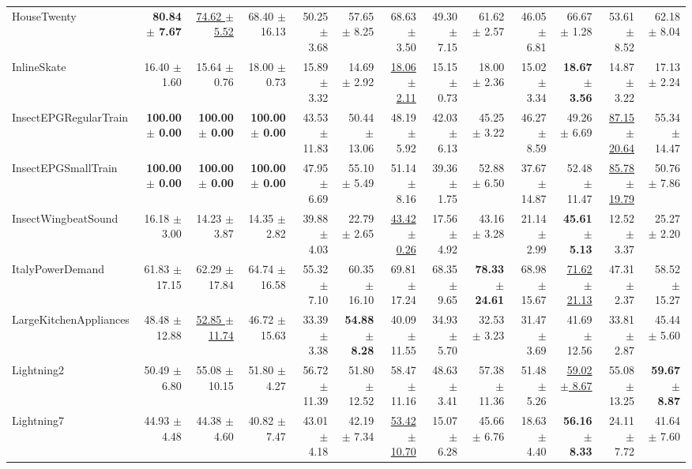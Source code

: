 \begin{landscape}
\begin{longtable}{lrrrrrrrrrrrr}
HouseTwenty & \textbf{80.84 $\pm$ 7.67} & \underline{74.62 $\pm$ 5.52} & 68.40 $\pm$ 16.13 & 50.25 $\pm$ 3.68 & 57.65 $\pm$ 8.25 & 68.63 $\pm$ 3.50 & 49.30 $\pm$ 7.15 & 61.62 $\pm$ 2.57 & 46.05 $\pm$ 6.81 & 66.67 $\pm$ 1.28 & 53.61 $\pm$ 8.52 & 62.18 $\pm$ 8.04 \\
InlineSkate & 16.40 $\pm$ 1.60 & 15.64 $\pm$ 0.76 & 18.00 $\pm$ 0.73 & 15.89 $\pm$ 3.32 & 14.69 $\pm$ 2.92 & \underline{18.06 $\pm$ 2.11} & 15.15 $\pm$ 0.73 & 18.00 $\pm$ 2.36 & 15.02 $\pm$ 3.34 & \textbf{18.67 $\pm$ 3.56} & 14.87 $\pm$ 3.22 & 17.13 $\pm$ 2.24 \\
InsectEPGRegularTrain & \textbf{100.00 $\pm$ 0.00} & \textbf{100.00 $\pm$ 0.00} & \textbf{100.00 $\pm$ 0.00} & 43.53 $\pm$ 11.83 & 50.44 $\pm$ 13.06 & 48.19 $\pm$ 5.92 & 42.03 $\pm$ 6.13 & 45.25 $\pm$ 3.22 & 46.27 $\pm$ 8.59 & 49.26 $\pm$ 6.69 & \underline{87.15 $\pm$ 20.64} & 55.34 $\pm$ 14.47 \\
InsectEPGSmallTrain & \textbf{100.00 $\pm$ 0.00} & \textbf{100.00 $\pm$ 0.00} & \textbf{100.00 $\pm$ 0.00} & 47.95 $\pm$ 6.69 & 55.10 $\pm$ 5.49 & 51.14 $\pm$ 8.16 & 39.36 $\pm$ 1.75 & 52.88 $\pm$ 6.50 & 37.67 $\pm$ 14.87 & 52.48 $\pm$ 11.47 & \underline{85.78 $\pm$ 19.79} & 50.76 $\pm$ 7.86 \\
InsectWingbeatSound & 16.18 $\pm$ 3.00 & 14.23 $\pm$ 3.87 & 14.35 $\pm$ 2.82 & 39.88 $\pm$ 4.03 & 22.79 $\pm$ 2.65 & \underline{43.42 $\pm$ 0.26} & 17.56 $\pm$ 4.92 & 43.16 $\pm$ 3.28 & 21.14 $\pm$ 2.99 & \textbf{45.61 $\pm$ 5.13} & 12.52 $\pm$ 3.37 & 25.27 $\pm$ 2.20 \\
ItalyPowerDemand & 61.83 $\pm$ 17.15 & 62.29 $\pm$ 17.84 & 64.74 $\pm$ 16.58 & 55.32 $\pm$ 7.10 & 60.35 $\pm$ 16.10 & 69.81 $\pm$ 17.24 & 68.35 $\pm$ 9.65 & \textbf{78.33 $\pm$ 24.61} & 68.98 $\pm$ 15.67 & \underline{71.62 $\pm$ 21.13} & 47.31 $\pm$ 2.37 & 58.52 $\pm$ 15.27 \\
LargeKitchenAppliances & 48.48 $\pm$ 12.88 & \underline{52.85 $\pm$ 11.74} & 46.72 $\pm$ 15.63 & 33.39 $\pm$ 3.38 & \textbf{54.88 $\pm$ 8.28} & 40.09 $\pm$ 11.55 & 34.93 $\pm$ 5.70 & 32.53 $\pm$ 3.23 & 31.47 $\pm$ 3.69 & 41.69 $\pm$ 12.56 & 33.81 $\pm$ 2.87 & 45.44 $\pm$ 5.60 \\
Lightning2 & 50.49 $\pm$ 6.80 & 55.08 $\pm$ 10.15 & 51.80 $\pm$ 4.27 & 56.72 $\pm$ 11.39 & 51.80 $\pm$ 12.52 & 58.47 $\pm$ 11.16 & 48.63 $\pm$ 3.41 & 57.38 $\pm$ 11.36 & 51.48 $\pm$ 5.26 & \underline{59.02 $\pm$ 8.67} & 55.08 $\pm$ 13.25 & \textbf{59.67 $\pm$ 8.87} \\
Lightning7 & 44.93 $\pm$ 4.48 & 44.38 $\pm$ 4.60 & 40.82 $\pm$ 7.47 & 43.01 $\pm$ 4.18 & 42.19 $\pm$ 7.34 & \underline{53.42 $\pm$ 10.70} & 15.07 $\pm$ 6.28 & 45.66 $\pm$ 6.76 & 18.63 $\pm$ 4.40 & \textbf{56.16 $\pm$ 8.33} & 24.11 $\pm$ 7.72 & 41.64 $\pm$ 7.60 \\

\end{longtable}
\end{landscape}
